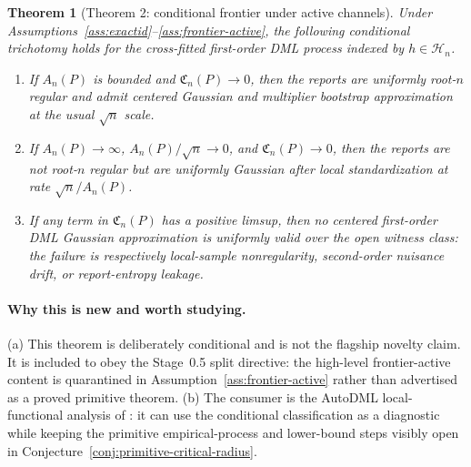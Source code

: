 \documentclass[11pt]{article}
\newcommand{\calH}{\mathcal{H}}
\theoremstyle{definition}
\theoremstyle{plain}
\newtheorem{theorem}{Theorem}
\theoremstyle{remark}
\begin{document}
\begin{theorem}[Theorem 2: conditional frontier under active channels]\label{thm:conditional-frontier}
Under Assumptions~\ref{ass:exactid}--\ref{ass:frontier-active}, the following
conditional trichotomy holds for the cross-fitted first-order DML process
indexed by \(h\in\calH_n\).
\begin{enumerate}[label=(\roman*)]
\item If \(A_n(P)\) is bounded and \(\mathfrak C_n(P)\to0\), then the reports
are uniformly root-\(n\) regular and admit centered Gaussian and multiplier
bootstrap approximation at the usual \(\sqrt n\) scale.
\item If \(A_n(P)\to\infty\), \(A_n(P)/\sqrt n\to0\), and
\(\mathfrak C_n(P)\to0\), then the reports are not root-\(n\) regular but are
uniformly Gaussian after local standardization at rate \(\sqrt n/A_n(P)\).
\item If any term in \(\mathfrak C_n(P)\) has a positive limsup, then no
centered first-order DML Gaussian approximation is uniformly valid over the
open witness class: the failure is respectively local-sample nonregularity,
second-order nuisance drift, or report-entropy leakage.
\end{enumerate}
\end{theorem}
\paragraph{Why this is new and worth studying.}
(a) This theorem is deliberately conditional and is not the flagship novelty
claim.  It is included to obey the Stage~0.5 split directive: the high-level
frontier-active content is quarantined in Assumption~\ref{ass:frontier-active}
rather than advertised as a proved primitive theorem.  (b) The consumer is the
AutoDML local-functional analysis of
\citet{ChernozhukovNeweySingh2022AutoDML}: it can use the conditional
classification as a diagnostic while keeping the primitive empirical-process
and lower-bound steps visibly open in
Conjecture~\ref{conj:primitive-critical-radius}.
\end{document}
